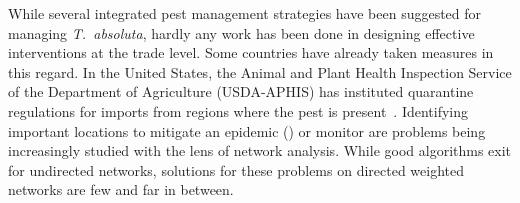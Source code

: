 \documentclass[11pt]{article}
\newcommand{\tuta}{\emph{T.~absoluta}}
\theoremstyle{definition}
\begin{document}
While several integrated pest management strategies have been suggested for
managing \tuta{}, hardly any work has been done in designing effective
interventions at the trade level. Some countries have already taken
measures in this regard. In the United States, the Animal and Plant Health
Inspection Service of the Department of Agriculture (USDA-APHIS) has
instituted quarantine regulations for imports from regions where the pest
is present~\cite{USDA2012}. Identifying important locations to mitigate an
epidemic (\cite{banks2015role,kiss2006network,pautasso2010disease}) or
monitor are problems being increasingly studied with the lens of network
analysis.  While good algorithms exit for undirected networks, solutions
for these problems on directed weighted networks are few and far in
between.



\end{document}
